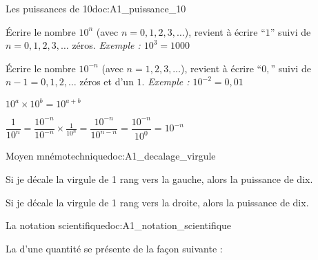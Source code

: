 \teteSndMeth



\vspace*{-24pt}

\begin{doc}{Les puissances de 10}{doc:A1_puissance_10}
  \begin{encart}
  \begin{listePoints}
    \item Écrire le nombre $10^n$ (avec $n = 0, 1, 2, 3, \ldots$), revient à écrire ``$1$'' suivi de $n = 0, 1, 2, 3, \ldots$ zéros. \textit{Exemple : $10^3 = 1000$}
    \item Écrire le nombre $10^{-n}$ (avec $n = 1, 2, 3, \ldots$), revient à écrire ``$0,$'' suivi de $n - 1 = 0, 1, 2, \ldots$ zéros et d'un $1$. \textit{Exemple : $10^{-2} = 0,\!01$}
    \item $10^a \times 10^b = 10^{a + b}$
    \item $\dfrac{1}{10^n} 
    = \dfrac{10^{-n}}{10^{-n}} \times \frac{1}{10^n} 
    = \dfrac{10^{-n}}{10^{n - n}}
    = \dfrac{10^{-n}}{10^0}
    = 10^{-n}$
  \end{listePoints}
  \end{encart}
\end{doc}
\bigskip

\begin{doc}{Moyen mnémotechnique}{doc:A1_decalage_virgule}
  \begin{listePoints}
    \item Si je décale la virgule de 1 rang vers la gauche, alors  la puissance de dix.
    \item Si je décale la virgule de 1 rang vers la droite, alors 
    la puissance de dix.
  \end{listePoints}
\end{doc}

\begin{doc}{La notation scientifique}{doc:A1_notation_scientifique}
  \begin{encart}
  La  d'une quantité se présente de la façon suivante :
  \begin{center}
    \qq{}
    \qq{}
  \end{center}
  \vspace*{-30pt} \hspace*{4pt}
  \end{encart}
\end{doc}

